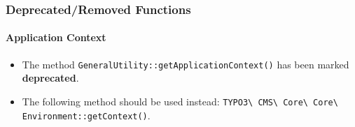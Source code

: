 
\begin{frame}[fragile]
	\frametitle{Deprecated/Removed Functions}
	\framesubtitle{Application Context}

	\lstset{basicstyle=\tiny\ttfamily}

	\begin{itemize}
		\item The method \texttt{GeneralUtility::getApplicationContext()} has been marked \textbf{deprecated}.
		\item The following method should be used instead:\newline
		 	\texttt{TYPO3\textbackslash
				CMS\textbackslash
				Core\textbackslash
				Core\textbackslash
				Environment::getContext()}.

	\end{itemize}

\end{frame}


